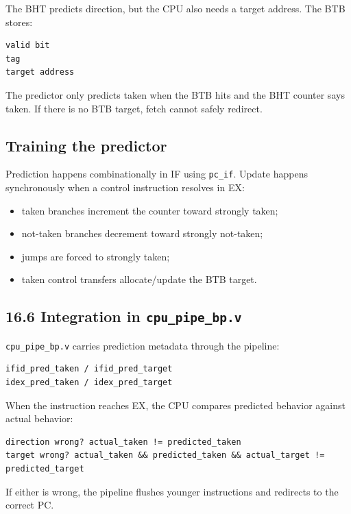 The BHT predicts direction, but the CPU also needs a target address. The BTB stores:

\begin{lstlisting}[language={}]
valid bit
tag
target address
\end{lstlisting}

The predictor only predicts taken when the BTB hits and the BHT counter says taken. If there is no BTB target, fetch cannot safely redirect.

\subsection{Training the predictor}

Prediction happens combinationally in IF using \texttt{pc\_if}. Update happens synchronously when a control instruction resolves in EX:

\begin{itemize}
\item taken branches increment the counter toward strongly taken;
\item not-taken branches decrement toward strongly not-taken;
\item jumps are forced to strongly taken;
\item taken control transfers allocate/update the BTB target.
\end{itemize}
\subsection{16.6 Integration in \texttt{cpu\_pipe\_bp.v}}

\texttt{cpu\_pipe\_bp.v} carries prediction metadata through the pipeline:

\begin{lstlisting}[language={}]
ifid_pred_taken / ifid_pred_target
idex_pred_taken / idex_pred_target
\end{lstlisting}

When the instruction reaches EX, the CPU compares predicted behavior against actual behavior:

\begin{lstlisting}[language={}]
direction wrong? actual_taken != predicted_taken
target wrong? actual_taken && predicted_taken && actual_target != predicted_target
\end{lstlisting}

If either is wrong, the pipeline flushes younger instructions and redirects to the correct PC.

